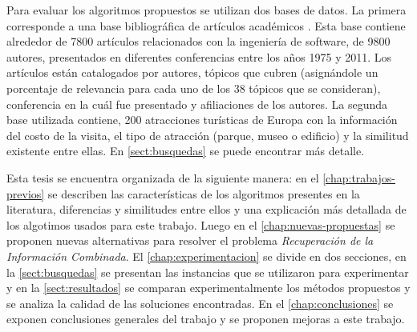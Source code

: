 Para evaluar los algoritmos propuestos se utilizan dos bases de datos. La primera corresponde a una base bibliográfica de artículos académicos \cite{dataDrive}. Esta base contiene alrededor de 7800 artículos relacionados con la ingeniería de software, de 9800 autores, presentados en diferentes conferencias entre los años 1975 y 2011. Los artículos están catalogados por autores, tópicos que cubren (asignándole un porcentaje de relevancia para cada uno de los 38 tópicos que se consideran), conferencia en la cuál fue presentado y afiliaciones de los autores. La segunda base utilizada contiene, 200 atracciones turísticas de Europa con la información del costo de la visita, el tipo de atracción (parque, museo o edificio) y la similitud existente entre ellas. En \autoref{sect:busquedas} se puede encontrar más detalle.

Esta tesis se encuentra organizada de la siguiente manera: en el \autoref{chap:trabajos-previos} se describen las características de los algoritmos presentes en la literatura, diferencias y similitudes entre ellos y una explicación más detallada de los algotimos usados para este trabajo. Luego en el \autoref{chap:nuevas-propuestas} se proponen nuevas alternativas para resolver el problema {\em Recuperación de la Información Combinada}. El \autoref{chap:experimentacion} se divide en dos secciones, en la \autoref{sect:busquedas} se presentan las instancias que se utilizaron para experimentar y en la \autoref{sect:resultados} se 
comparan experimentalmente los métodos propuestos y se analiza la calidad de las soluciones encontradas. En el \autoref{chap:conclusiones} se exponen conclusiones generales del trabajo y se proponen mejoras a este trabajo.
